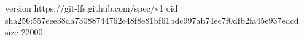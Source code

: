 version https://git-lfs.github.com/spec/v1
oid sha256:557eee38da73088744762e48f8e81bf61bdc997ab74ec7f0dfb2fa45e937edcd
size 22000
